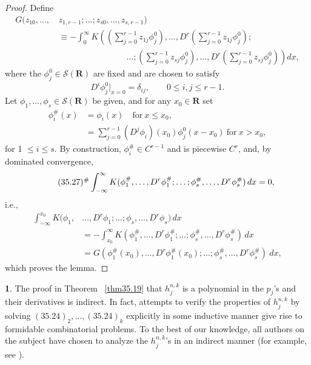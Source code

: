 \documentclass{surv-l}
\theoremstyle{plain}
\theoremstyle{definition}
\newtheorem{remark}[theorem]{\sc{Remark}}
\numberwithin{equation}{chapter}
\begin{document}
\begin{proof}
Define
\begin{align*}
G(z_{10},\ldots,\,&z_{1,r-1};\ldots;z_{s0},\ldots,z_{s,r-1})\\
&\equiv-\int_{0}^{\infty}K\left(\left(\sum_{j=0}^{r-1}z_{1j}\phi_{j}^{0}\right)\right.,\ldots,D^{r}\left(\sum_{j=0}^{r-1}z_{1j}\phi_{j}^{0}\right);\\
&\qquad\qquad\qquad\qquad\ldots;\left.\left(\sum_{j=0}^{r-1}z_{sj}\phi_{j}^{0}\right),\ldots,D^{r}\left(\sum_{j=0}^{r-1}z_{sj}\phi_{j}^{0}\right)\right)dx,
\end{align*}
where the $\phi_{j}^{0}\in \mathscr{S}(\mathbf{R})$ are fixed and are chosen to satisfy
\begin{equation*}
D^{i}\phi_{j}^{0}|_{x=0}=\delta_{ij},\qquad 0\leq i,j\leq r-1.
\end{equation*}
Let $\phi_{1},\ldots,\phi_{s}\in \mathscr{S}(\mathbf{R})$ be given, and for any $x_{0}\in \mathbf{R}$ set
\begin{align*}
\phi_{i}^{\#}(x)&=\phi_{i}(x)\quad \mathrm{for}\ x\leq x_{0},\\
&=\displaystyle \sum_{j=0}^{r-1}(D^{j}\phi_{i})(x_{0})\phi_{j}^{0}(x-x_{0})\ \mathrm{for}\ x>x_{0},
\end{align*}
for 1 $\leq i\leq s$. By construction, $\phi_{i}^{\#}\in C^{r-1}$ and is piecewise $C^{r}$, and, by dominated convergence,
\begin{equation*}
\tag*{$(35.27)^{\#}$}  \int_{-\infty}^{\infty}K(\phi_{1}^{\#},\ldots,D^{r}\phi_{1}^{\#};\ldots;\phi_{s}^{\#}, \ldots,D^{r}\phi_{s}^{\#})\,dx=0,
\end{equation*}
i.e.,
\begin{align*}
\int_{-\infty}^{x_{0}}K(\phi_{1},&\ldots,D^{r}\phi_{1};\ldots;\phi_{s},\ldots,D^{r}\phi_{s})\,dx\\
&=-\int_{x_{0}}^{\infty}K(\phi_{1}^{\#},\ldots,D^{r}\phi_{1}^{\#};\ldots;\phi_{s}^{\#},\ldots, D^{r}\phi_{s}^{\#})\,dx\\
&=G(\phi_{1}^{\#}(x_{0}),\ldots,D^{r}\phi_{1}^{\#}(x_{0});\ldots;\phi_{s}^{\#}, \ldots,D^{r}\phi_{s}^{\#})\ dx,
\end{align*}
which proves the lemma.\quad
\end{proof}
\setcounter{theorem}{28}
\begin{remark}\label{rem35.29}
The proof in Theorem ~\ref{thm35.19} that $h_{j}^{n,k}$ is a polynomial in the $p_{j}$'s and their derivatives is indirect. In fact, attempts to verify the properties of $h_{j}^{n,k}$ by solving $(35.24)_{2},\ldots,(35.24)_{k}$ explicitly in some inductive manner give rise to formidable combinatorial problems. To the best of our knowledge, all authors on the subject have chosen to analyze the $h_{j}^{n,k}$'s in an indirect manner (for example, see \cite{GD, KW}).
\end{remark}
\end{document}

